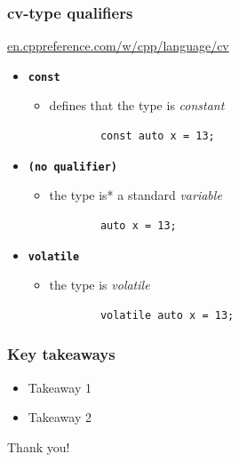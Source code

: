 \documentclass[aspectratio=169]{beamer}
\newcommand{\cpp}[1]{\texttt{\textbf{\textcolor{clCodeBlue}{#1}}}}
\begin{document}
\begin{frame}[fragile]
\frametitle{cv-type qualifiers}
\href{https://en.cppreference.com/w/cpp/language/cv}{en.cppreference.com/w/cpp/language/cv}
\vspace{6pt}
  \begin{itemize}
    \item<2->{\cpp{const}}
    \begin{itemize}
      \item{defines that the type is \textit{constant} \hspace{2em} }
      \begin{lstlisting}
        const auto x = 13;
      \end{lstlisting}
    \end{itemize}

    \vspace{3pt}
    \item<3->{\cpp{(no qualifier)}}
    \begin{itemize}
      \item{the type is* a standard \textit{variable} \hspace{2.4em} }
      \begin{lstlisting}
        auto x = 13;
      \end{lstlisting}
    \end{itemize}

    \vspace{3pt}
    \item<4->{\cpp{volatile}}
    \begin{itemize}
      \item{the type is \textit{volatile} \hspace{7.8em} }
      \begin{lstlisting}
        volatile auto x = 13;
      \end{lstlisting}
    \end{itemize}
  \end{itemize}
\end{frame}

\begin{frame}
\frametitle{Key takeaways}
{\centering
\begin{itemize}
  \item{Takeaway 1}
  \item{Takeaway 2}
\end{itemize}

\vspace{2ex}
\begin{center}{\Large Thank you!}\end{center}
}
\end{frame}
\end{document}
